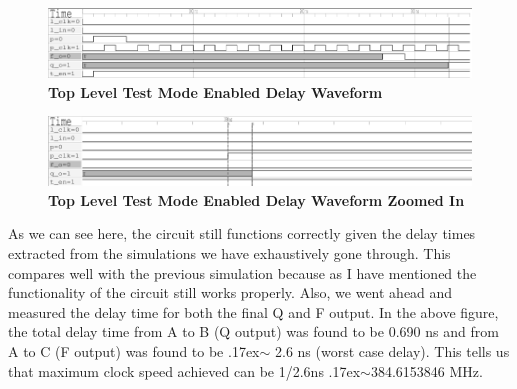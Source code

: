 \documentclass[a4paper]{article}
\begin{document}
    \begin{figure}[H]
        \centering
        \includegraphics[width=\textwidth,height=\textheight,keepaspectratio]{../../vhdl/delay_waveforms/top_test_delay_wf.png}
        \caption{\textbf{Top Level Test Mode Enabled Delay Waveform}}
        \label{fig:gg}
    \end{figure}
    \begin{figure}[H]
        \centering
        \includegraphics[width=\textwidth,height=\textheight,keepaspectratio]{../../vhdl/delay_waveforms/top_test_delay.png}
        \caption{\textbf{Top Level Test Mode Enabled Delay Waveform Zoomed In}}
        \label{fig:gg}
    \end{figure}

    As we can see here, the circuit still functions correctly given the delay times extracted from the
    simulations we have exhaustively gone through. This compares well with the previous simulation because
    as I have mentioned the functionality of the circuit still works properly. Also, we went ahead and measured
    the delay time for both the final Q and F output. In the above figure, the total delay time from A to B (Q
    output) was found to be 0.690 ns and from A to C (F output) was found to be {\raise.17ex\hbox{$\scriptstyle\sim$}}
    2.6 ns (worst case delay). This tells us that maximum clock speed achieved can be 1/2.6ns
    {\raise.17ex\hbox{$\scriptstyle\sim$}}384.6153846 MHz.
\end{document}
